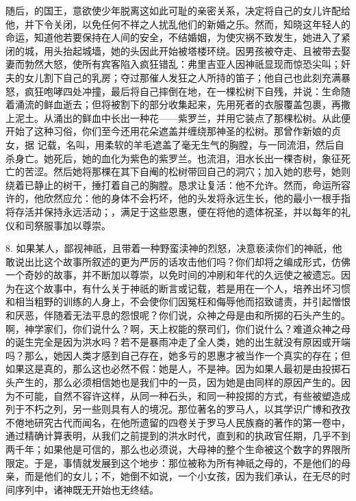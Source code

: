 随后，的国王，意欲使少年脱离这如此可耻的亲密关系，决定将自己的女儿许配给他，并下令关闭，以免任何不祥之人扰乱他们的新婚之乐。然而，知晓这年轻人的命运，知道他若要保持在人间的安全，不结婚姻，为使灾祸不致发生，她进入了紧闭的城，用头抬起城墙，她的头因此开始被塔楼环绕。因男孩被夺走、且被带去娶妻而勃然大怒，使所有宾客陷入疯狂错乱：弗里吉亚人因神祇显现而惊恐尖叫；奸夫的女儿割下自己的乳房；夺过那催人发狂之人所持的笛子；他自己也此刻充满暴怒，疯狂咆哮四处冲撞，最后将自己摔倒在地，在一棵松树下自残，并说：生命随着涌流的鲜血逝去；但将被割下的部分收集起来，先用死者的衣服覆盖包裹，再撒上泥土。从涌出的鲜血中长出一种花——紫罗兰，并用它装点了那棵松树。从此便开始了这种习俗，你们至今还用花朵遮盖并缠绕那神圣的松树。那曾作新娘的贞女，据 记载，名叫，用柔软的羊毛遮盖了毫无生气的胸膛，与一同流泪，然后自杀身亡。她死后，她的血化为紫色的紫罗兰。也流泪，泪水长出一棵杏树，象征死亡的苦涩。然后她将那棵在其下自阉的松树带回自己的洞穴；加入她的悲号，她则绕着已静止的树干，捶打着自己的胸膛。恳求让复活：他不允许。然而，命运所容许的，他欣然应允：他的身体不会朽坏，他的头发将永远生长，他的最小一根手指将存活并保持永远活动；，满足于这些恩惠，便在将他的遗体祝圣，并以每年的礼仪和司祭服事加以尊崇。\par

8. 如果某人，鄙视神祇，且带着一种野蛮渎神的烈怒，决意亵渎你们的神祇，他敢说出比这个故事所叙述的更为严厉的话攻击他们吗？你们却将之编成形式，仿佛一个奇妙的故事，并不断加以尊崇，以免时间的冲刷和年代的久远使之被遗忘。因为在这个故事中，有什么关于神祇的断言或记载，若是用在一个人，培养出坏习惯和相当粗野的训练的人身上，不会使你们因冤枉和侮辱他而招致谴责，并引起憎恨和厌恶，伴随着无法平息的怨恨呢？你们说，众神之母是由和所掷的石头产生的。啊，神学家们，你们说什么？啊，天上权能的祭司们，你们说什么？难道众神之母的诞生完全是因为洪水吗？若不是暴雨冲走了全人类，她的出生就没有原因或开端吗？那么，她因人类才感到自己存在，她多亏的恩惠才被当作一个真实的存在；但如果这是真的，那么这也必然不假：她是人，不是神。因为如果人最初是由投掷石头产生的，那么必须相信她也是我们中的一员，因为她是由同样的原因产生的。因为不可能，自然不容许这样，从同一种石头，和同一种投掷的方式，有些被塑造成列于不朽之列，另一些则具有人的境况。那位著名的罗马人，以其学识广博和孜孜不倦地研究古代而闻名，在他所遗留的四卷关于罗马人民族裔的著作的第一卷中，通过精确计算表明，从我们之前提到的洪水时代，直到和的执政官任期，几乎不到两千年；如果他是可信的，那么也必须说，大母神的整个生命被这个数字的界限所限定。于是，事情就发展到这个地步：那位被称为所有神祇之母的，不是他们的母亲，而是他们的女儿；不，她倒不如说，一个小女孩，因为我们承认，在无尽的时间序列中，诸神既无开始也无终结。\par

